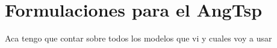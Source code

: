 \section*{Formulaciones para el AngTsp}

Aca tengo que contar sobre todos los modelos que vi y cuales voy a usar